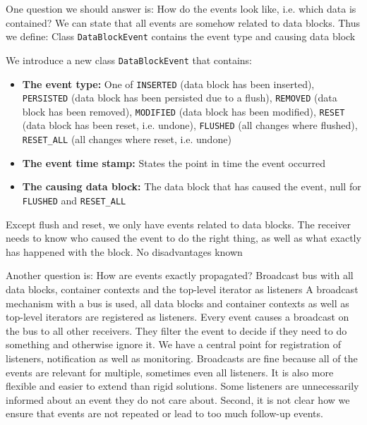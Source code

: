 One question we should answer is: How do the events look like, i.e. which data is contained? We can state that all events are somehow related to data blocks. Thus we define:
{%
Class \texttt{DataBlockEvent} contains the event type and causing data block
}
{%
  We introduce a new class \texttt{DataBlockEvent} that contains:
  \begin{itemize}
  \item \textbf{The event type:} One of \texttt{INSERTED} (data block has been inserted), \texttt{PERSISTED} (data block has been persisted due to a flush), \texttt{REMOVED} (data block has been removed), \texttt{MODIFIED} (data block has been modified), \texttt{RESET} (data block has been reset, i.e. undone), \texttt{FLUSHED} (all changes where flushed), \texttt{RESET\_ALL} (all changes where reset, i.e. undone)
  \item \textbf{The event time stamp:} States the point in time the event occurred
  \item \textbf{The causing data block:} The data block that has caused the event, null for \texttt{FLUSHED} and \texttt{RESET\_ALL} 
  \end{itemize}
}
{%
Except flush and reset, we only have events related to data blocks. The receiver needs to know who caused the event to do the right thing, as well as what exactly has happened with the block.
}
{%
No disadvantages known
}

Another question is: How are events exactly propagated?
{%
Broadcast bus  with all data blocks, container contexts and the top-level iterator as listeners
}
{%
A broadcast mechanism with a bus is used, all data blocks and container contexts as well as top-level iterators are registered as listeners. Every event causes a broadcast on the bus to all other receivers. They filter the event to decide if they need to do something and otherwise ignore it.
}
{%
We have a central point for registration of listeners, notification as well as monitoring. Broadcasts are fine because all of the events are relevant for multiple, sometimes even all listeners. It is also more flexible and easier to extend than rigid solutions. 
}
{%
Some listeners are unnecessarily informed about an event they do not care about. Second, it is not clear how we ensure that events are not repeated or lead to too much follow-up events.
}

